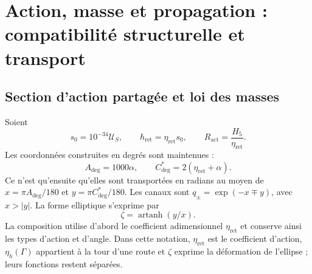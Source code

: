 \section{Action, masse et propagation : compatibilité structurelle et transport}
\label{md:hib:seccion}

\subsection{Section d’action partagée et loi des masses}
\label{md:hib:accion-masas}

Soient
\begin{equation}
 s_0=10^{-34}\mathcal U_S,\qquad
 \hbar_{\mathrm{ret}}=\eta_{\mathrm{ret}}s_0,\qquad
 R_{\mathrm{act}}=\frac{H_5}{\eta_{\mathrm{ret}}}.
 \label{md:hib:accion}
\end{equation}
Les coordonnées construites en degrés sont maintenues :
\begin{equation}
 A_{\deg}=1000\alpha,\qquad
 C^*_{\deg}=2(\eta_{\mathrm{ret}}+\alpha).
 \label{md:hib:angulos}
\end{equation}
Ce n’est qu’ensuite qu’elles sont transportées en radians au moyen de
$x=\pi A_{\deg}/180$ et $y=\pi C^*_{\deg}/180$. Les canaux sont
$q_\pm=\exp(-x\mp y)$, avec $x>|y|$. La forme elliptique s’exprime par
\begin{equation}
 \zeta=\operatorname{artanh}(y/x).
 \label{md:hib:forma}
\end{equation}
La composition utilise d’abord le coefficient adimensionnel
$\eta_{\mathrm{ret}}$ et conserve ainsi les types d’action et d’angle.
Dans cette notation, $\eta_{\mathrm{ret}}$ est le coefficient d’action,
$\eta_h(\Gamma)$ appartient à la tour d’une route et $\zeta$ exprime la
déformation de l’ellipse ; leurs fonctions restent séparées.

